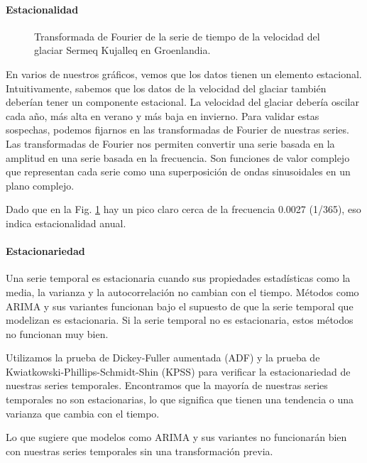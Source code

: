 \documentclass[sigconf,authordraft,language=spanish]{acmart}
\begin{document}
\paragraph{Estacionalidad}

\begin{figure}[htbp]
   \centering
   
    \caption{Transformada de Fourier de la serie de tiempo de la velocidad del glaciar Sermeq Kujalleq en Groenlandia.}
    \label{fig:frequencies}
\end{figure}

En varios de nuestros gráficos, vemos que los datos tienen un elemento estacional. Intuitivamente, sabemos que los datos de la velocidad del glaciar también deberían tener un componente estacional. La velocidad del glaciar debería oscilar cada año, más alta en verano y más baja en invierno. 
Para validar estas sospechas, podemos fijarnos en las transformadas de Fourier de nuestras series.
Las transformadas de Fourier nos permiten convertir una serie basada en la amplitud en una serie basada en la frecuencia. Son funciones de valor complejo que representan cada serie como una superposición de ondas sinusoidales en un plano complejo.

Dado que en la Fig. \ref{fig:frequencies} hay un pico claro cerca de la frecuencia 0.0027 (1/365), eso indica estacionalidad anual.


\paragraph{Estacionariedad}

Una serie temporal es estacionaria cuando sus propiedades estadísticas como la media, la varianza y la autocorrelación no cambian con el tiempo.
Métodos como ARIMA y sus variantes funcionan bajo el supuesto de que la serie temporal que modelizan es estacionaria. Si la serie temporal no es estacionaria, estos métodos no funcionan muy bien.

Utilizamos la prueba de Dickey-Fuller aumentada (ADF) y la prueba de Kwiatkowski-Phillips-Schmidt-Shin (KPSS) para verificar la estacionariedad de nuestras series temporales.
Encontramos que la mayoría de nuestras series temporales no son estacionarias, lo que significa que tienen una tendencia o una varianza que cambia con el tiempo.

Lo que sugiere que modelos como ARIMA y sus variantes no funcionarán bien con nuestras series temporales sin una transformación previa.
\end{document}
